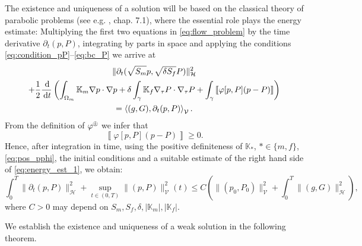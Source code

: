 \documentclass[a4paper]{article}
\def\d {\,{\rm d}}
\def\ddt#1{\frac{\d #1}{\d t}}
\def\dt{\prtl_t}
\def\dual#1#2{\left\langle #1,#2\right\rangle}
\def\Hf{\mathcal H}
\def\jmp#1{\left\llbracket #1 \right\rrbracket}
\def\norm#1{\|#1\|}
\def\pphi{{\varphi}}
\def\prtl{\partial}
\def\tn#1{{\mathbb{#1}}}    %
\def\Vf{{\mathcal V}} %
\newcommand{\eq}[1]{\begin{equation}#1\end{equation}}
\newcommand{\ml}[1]{\begin{multline}#1\end{multline}}
\newcommand{\opm}{ %
  {\mathbin{
    \mathchoice
      {\buildcirclepm{\displaystyle     }{0.14ex}{0.95}{0.05ex}{.7}}
      {\buildcirclepm{\textstyle        }{0.14ex}{0.95}{0.05ex}{.7}}
      {\buildcirclepm{\scriptstyle      }{0.13ex}{0.955}{0.04ex}{.55}}
      {\buildcirclepm{\scriptscriptstyle}{0.08ex}{0.95}{0.03ex}{.45}}
  }} 
}
\newcommand\buildcirclepm[5]{%
  \begin{tikzpicture}[baseline=(X.base), inner sep=-#5, outer sep=-.65]
    \node[draw,circle,line width=#4] (X)  {\footnotesize\raisebox{#2}{\scalebox{#3}{$#1\pm$}}};
  \end{tikzpicture}%
}
\begin{document}
The existence and uniqueness of a solution will be based on the classical theory of parabolic problems (see e.g. \cite{evans_pde}, chap. 7.1), where the essential role plays the energy estimate:
Multiplying the first two equations in \eqref{eq:flow_problem} by the time derivative $\dt(p,P)$, integrating by parts in space and applying the conditions \eqref{eq:condition_pP}--\eqref{eq:bc_P} we arrive at
\ml{\label{eq:energy_est_1} \norm{\dt(\sqrt{S_m} p,\sqrt{\delta S_f} P)}_\Hf^2\\
+ \frac12\ddt{}\left(\int_{\Omega_m}\tn K_m\nabla p\cdot\nabla p
+ \delta\int_\gamma\tn K_f\nabla_\tau P\cdot\nabla_\tau P
+ \int_\gamma\jmp{\pphi[p,P](p-P)}\right)\\
= \dual{(g,G)}{\dt(p,P)}_\Vf. }
From the definition of $\pphi^\opm$ we infer that
\eq{ \label{eq:pos_pphi} \jmp{\pphi[p,P](p-P)}\ge 0. }
Hence, after integration in time, using the positive definiteness of $\tn K_*$, $*\in\{m,f\}$, \eqref{eq:pos_pphi}, the initial conditions and a suitable estimate of the right hand side of \eqref{eq:energy_est_1}, we obtain:
\eq{ \label{eq:energy_est_flow} \int_0^T\norm{\dt(p,P)}_\Hf^2 + \sup_{t\in(0,T)}\norm{(p,P)}_\Vf^2(t) \le C\left(\norm{(p_0,P_0)}_\Vf^2 + \int_0^T\norm{(g,G)}_{\Hf}^2\right), }
where $C>0$ may depend on $S_m,S_f,\delta,|\tn K_m|,|\tn K_f|$.

We establish the existence and uniqueness of a weak solution in the following theorem.
\end{document}
